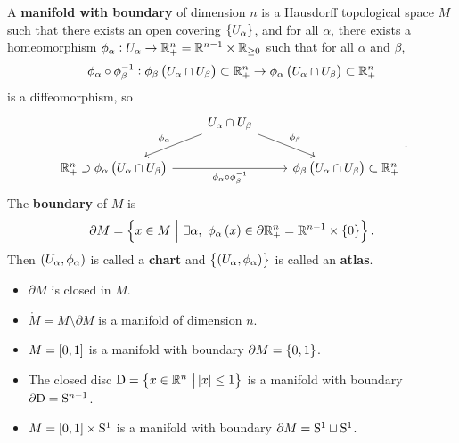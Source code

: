 \begin{definition}
A \textbf{manifold with boundary} of dimension $ n $ is a Hausdorff topological space $ M $ such that there exists an open covering $ \cbr{U_\alpha} $, and for all $ \alpha $, there exists a homeomorphism $ \phi_\alpha : U_\alpha \to \RR_+^n = \RR^{n - 1} \times \RR_{\ge 0} $ such that for all $ \alpha $ and $ \beta $,
$$ \phi_\alpha \circ \phi_\beta^{-1} : \phi_\beta\br{U_\alpha \cap U_\beta} \subset \RR_+^n \to \phi_\alpha\br{U_\alpha \cap U_\beta} \subset \RR_+^n $$
is a diffeomorphism, so
$$
\begin{tikzcd}
& U_\alpha \cap U_\beta \arrow[swap]{dl}{\phi_\alpha} \arrow{dr}{\phi_\beta} & \\
\RR_+^n \supset \phi_\alpha\br{U_\alpha \cap U_\beta} \arrow[swap]{rr}{\phi_\alpha \circ \phi_\beta^{-1}} & & \phi_\beta\br{U_\alpha \cap U_\beta} \subset \RR_+^n
\end{tikzcd}.
$$
The \textbf{boundary} of $ M $ is
$$ \partial M = \cbr{x \in M \st \exists \alpha, \ \phi_\alpha\br{x} \in \partial\RR_+^n = \RR^{n - 1} \times \cbr{0}}. $$
Then $ \br{U_\alpha, \phi_\alpha} $ is called a \textbf{chart} and $ \cbr{\br{U_\alpha, \phi_\alpha}} $ is called an \textbf{atlas}.
\end{definition}

\begin{remark}
\hfill
\begin{itemize}
\item $ \partial M $ is closed in $ M $.
\item $ \mathring{M} = M \setminus \partial M $ is a manifold of dimension $ n $.
\end{itemize}
\end{remark}

\begin{example}
\hfill
\begin{itemize}
\item $ M = \sbr{0, 1} $ is a manifold with boundary $ \partial M = \cbr{0, 1} $.
\item The closed disc $ \D = \cbr{x \in \RR^n \st \abs{x} \le 1} $ is a manifold with boundary $ \partial\D = \S^{n - 1} $.
\item $ M = \sbr{0, 1} \times \S^1 $ is a manifold with boundary $ \partial M = \S^1 \sqcup \S^1 $.
\end{itemize}
\end{example}

